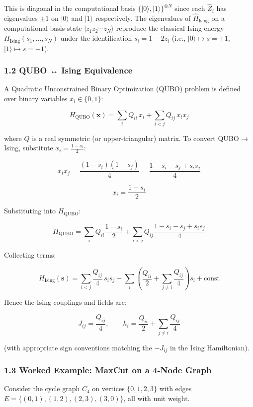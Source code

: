 \documentclass[
  11pt,
]{report}
\begin{document}
This is diagonal in the computational basis
\(\{|0\rangle, |1\rangle\}^{\otimes N}\) since each \(\hat{Z}_i\) has
eigenvalues \(\pm 1\) on \(|0\rangle\) and \(|1\rangle\) respectively.
The eigenvalues of \(\hat{H}_{\text{Ising}}\) on a computational basis
state \(|z_1 z_2 \cdots z_N\rangle\) reproduce the classical Ising
energy \(H_{\text{Ising}}(s_1, \ldots, s_N)\) under the identification
\(s_i = 1 - 2z_i\) (i.e., \(|0\rangle \mapsto s=+1\),
\(|1\rangle \mapsto s=-1\)).

\subsubsection{1.2 QUBO ↔ Ising
Equivalence}\label{qubo-ising-equivalence}

A Quadratic Unconstrained Binary Optimization (QUBO) problem is defined
over binary variables \(x_i \in \{0, 1\}\):

\[H_{\text{QUBO}}(\mathbf{x}) = \sum_{i} Q_{ii}\, x_i + \sum_{i < j} Q_{ij}\, x_i x_j\]

where \(Q\) is a real symmetric (or upper-triangular) matrix. To convert
QUBO → Ising, substitute \(x_i = \frac{1 - s_i}{2}\):

\[x_i x_j = \frac{(1-s_i)(1-s_j)}{4} = \frac{1 - s_i - s_j + s_i s_j}{4}\]

\[x_i = \frac{1 - s_i}{2}\]

Substituting into \(H_{\text{QUBO}}\):

\[H_{\text{QUBO}} = \sum_i Q_{ii} \frac{1 - s_i}{2} + \sum_{i<j} Q_{ij} \frac{1 - s_i - s_j + s_i s_j}{4}\]

Collecting terms:

\[H_{\text{Ising}}(\mathbf{s}) = \sum_{i<j} \frac{Q_{ij}}{4}\, s_i s_j - \sum_i \left(\frac{Q_{ii}}{2} + \sum_{j \neq i} \frac{Q_{ij}}{4}\right) s_i + \text{const}\]

Hence the Ising couplings and fields are:

\[J_{ij} = \frac{Q_{ij}}{4}, \qquad h_i = \frac{Q_{ii}}{2} + \sum_{j \neq i} \frac{Q_{ij}}{4}\]

(with appropriate sign conventions matching the \(-J_{ij}\) in the Ising
Hamiltonian).

\subsubsection{1.3 Worked Example: MaxCut on a 4-Node
Graph}\label{worked-example-maxcut-on-a-4-node-graph}

Consider the cycle graph \(C_4\) on vertices \(\{0, 1, 2, 3\}\) with
edges \(E = \{(0,1), (1,2), (2,3), (3,0)\}\), all with unit weight.
\end{document}

